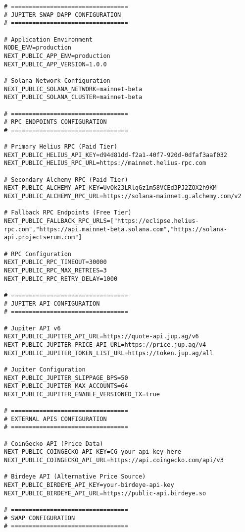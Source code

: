 \documentclass[11pt,a4paper]{article}
\begin{document}
\begin{lstlisting}[style=env, caption=.env.local (Production)]
# =================================
# JUPITER SWAP DAPP CONFIGURATION
# =================================

# Application Environment
NODE_ENV=production
NEXT_PUBLIC_APP_ENV=production
NEXT_PUBLIC_APP_VERSION=1.0.0

# Solana Network Configuration
NEXT_PUBLIC_SOLANA_NETWORK=mainnet-beta
NEXT_PUBLIC_SOLANA_CLUSTER=mainnet-beta

# =================================
# RPC ENDPOINTS CONFIGURATION
# =================================

# Primary Helius RPC (Paid Tier)
NEXT_PUBLIC_HELIUS_API_KEY=d94d81dd-f2a1-40f7-920d-0dfaf3aaf032
NEXT_PUBLIC_HELIUS_RPC_URL=https://mainnet.helius-rpc.com

# Secondary Alchemy RPC (Paid Tier)
NEXT_PUBLIC_ALCHEMY_API_KEY=UvOk23LRlqGz1m58VCEd3PJ2ZOX2h9KM
NEXT_PUBLIC_ALCHEMY_RPC_URL=https://solana-mainnet.g.alchemy.com/v2

# Fallback RPC Endpoints (Free Tier)
NEXT_PUBLIC_FALLBACK_RPC_URLS=["https://eclipse.helius-rpc.com","https://api.mainnet-beta.solana.com","https://solana-api.projectserum.com"]

# RPC Configuration
NEXT_PUBLIC_RPC_TIMEOUT=30000
NEXT_PUBLIC_RPC_MAX_RETRIES=3
NEXT_PUBLIC_RPC_RETRY_DELAY=1000

# =================================
# JUPITER API CONFIGURATION
# =================================

# Jupiter API v6
NEXT_PUBLIC_JUPITER_API_URL=https://quote-api.jup.ag/v6
NEXT_PUBLIC_JUPITER_PRICE_API_URL=https://price.jup.ag/v4
NEXT_PUBLIC_JUPITER_TOKEN_LIST_URL=https://token.jup.ag/all

# Jupiter Configuration
NEXT_PUBLIC_JUPITER_SLIPPAGE_BPS=50
NEXT_PUBLIC_JUPITER_MAX_ACCOUNTS=64
NEXT_PUBLIC_JUPITER_ENABLE_VERSIONED_TX=true

# =================================
# EXTERNAL APIS CONFIGURATION
# =================================

# CoinGecko API (Price Data)
NEXT_PUBLIC_COINGECKO_API_KEY=CG-your-api-key-here
NEXT_PUBLIC_COINGECKO_API_URL=https://api.coingecko.com/api/v3

# Birdeye API (Alternative Price Source)
NEXT_PUBLIC_BIRDEYE_API_KEY=your-birdeye-api-key
NEXT_PUBLIC_BIRDEYE_API_URL=https://public-api.birdeye.so

# =================================
# SWAP CONFIGURATION
# =================================


\end{lstlisting}
\end{document}
